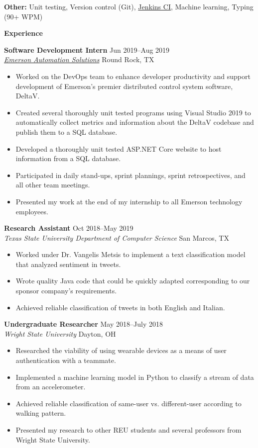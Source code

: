 \documentclass[10pt]{article}
\newlength{\headingborderwidth}
\newcommand{\resheading}[1]{
    \begin{mdframed}[
        backgroundcolor=black!15,
        linewidth=\headingborderwidth,
        innertopmargin=4pt,
        innerbottommargin=4pt,
        skipabove=6pt,
        skipbelow=2pt]
        \textbf{\large #1}
    \end{mdframed}
}
\newcommand{\ressubheading}[4]{
    \textbf{#1} \hfill #2 \\[0pt]
    \textit{#3} \hfill #4 \\[0pt]
}
\newenvironment{resitemize}{
    \vspace{-6pt}
    \begin{itemize}
    \setlength\itemsep{-2pt}
}{
    \end{itemize}
}
\begin{document}
\begin{NoHyper}
\textbf{Other:}
    Unit testing,
    Version control (Git),
    \href{https://jenkins.io/}{Jenkins CI},
    Machine learning,
    Typing (90+ WPM)

%
%

\resheading{Experience}

\ressubheading
	{Software Development Intern}
	{Jun 2019--Aug 2019}
	{\href{https://www.emerson.com/en-us/automation-solutions}{Emerson Automation Solutions}}
	{Round Rock, TX}
    \begin{resitemize}
        \item Worked on the DevOps team to enhance developer productivity and support development of Emerson's premier distributed control system software, DeltaV.
        \item Created several thoroughly unit tested programs using Visual Studio 2019 to automatically collect metrics and information about the DeltaV codebase and publish them to a SQL database.
        \item Developed a thoroughly unit tested ASP.NET Core website to host information from a SQL database.
        \item Participated in daily stand-ups, sprint plannings, sprint retrospectives, and all other team meetings.
        \item Presented my work at the end of my internship to all Emerson technology  employees.
    \end{resitemize}

\ressubheading
	{Research Assistant}
	{Oct 2018--May 2019}
	{Texas State University Department of Computer Science}
	{San Marcos, TX}
    \begin{resitemize}
    	\item Worked under Dr. Vangelis Metsis to implement a text classification model that analyzed sentiment in tweets.
    	\item Wrote quality Java code that could be quickly adapted corresponding to our sponsor company's requirements.
        \item Achieved reliable classification of tweets in both English and Italian.
    \end{resitemize}

\ressubheading
	{Undergraduate Researcher}
	{May 2018--July 2018}
	{Wright State University}
	{Dayton, OH}
    \begin{resitemize}
        \item Researched the viability of using wearable devices as a means of user authentication with a teammate.
        \item Implemented a machine learning model in Python to classify a stream of data from an accelerometer.
        \item Achieved reliable classification of same-user vs. different-user according to walking pattern.
        \item Presented my research to other REU students and several professors from Wright State University.
    \end{resitemize}


\end{NoHyper}
\end{document}
